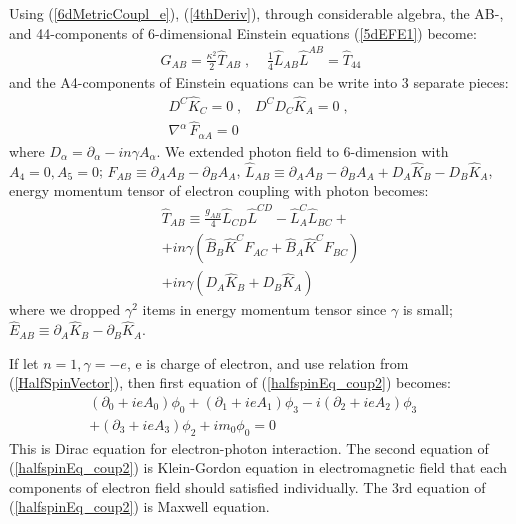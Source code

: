 \documentclass[twocolumn,showpacs,preprintnumbers,amsmath,amssymb]{revtex4}
\begin{document}
Using (\ref{6dMetricCoupl_e}), (\ref{4thDeriv}), through considerable algebra, the AB-, and 44-components of 
6-dimensional Einstein equations (\ref{5dEFE1}) become:
\begin{eqnarray}
G_{AB} = \frac{\kappa^2}{2} \hat{T}_{AB} \;, \; \; \; \;
\frac{1}{4}\hat{L}_{AB} \hat{L}^{AB} = \hat{T}_{44} 
\label{halfspinEq_coupl}
\end{eqnarray}
and the A4-components of Einstein equations can be write into 3 separate pieces:
\begin{eqnarray}
D^{C} \hat{K}_{C} = 0 \;, \; \; \; D^{C} D_{C} \hat{K}_{A} = 0 \;, \;\nonumber \\
\nabla^{\alpha} \, \hat{F}_{\alpha A} = 0 
\label{halfspinEq_coup2}
\end{eqnarray}
where $D_{\alpha} =\partial_{\alpha} - in\gamma A_{\alpha} $.
We extended photon field
to 6-dimension with $A_4 = 0, A_5 = 0$; $F_{AB} \equiv \partial_{A} A_{B} - \partial_{B} A_{A}$, 
$\hat{L}_{AB} \equiv \partial_{A} A_{B} - 
\partial_{B} A_{A} + D_{A}\hat{K}_{B} - D_{B} \hat{K}_{A}$, energy momentum tensor of electron coupling with photon becomes:
\begin{eqnarray}
\hat{T}_{AB} \equiv \frac{g_{AB}}{4}\hat{L}_{CD}\hat{L}^{CD} - \hat{L}_{A}^{C} \hat{L}_{BC} + \nonumber\\
     + in\gamma(\hat{B}_{B}\hat{K}^C F_{AC} + \hat{B}_{A}\hat{K}^C F_{BC}) \nonumber \\
     + in\gamma (D_{A}\hat{K}_{B} + D_{B}\hat{K}_{A}) 
\label{halfSpinT_e}
\end{eqnarray}
where we dropped $\gamma^2$ items in energy momentum tensor since $\gamma$ is small; $\hat{E}_{AB} \equiv \partial_{A} \hat{K}_{B} - 
\partial_{B} \hat{K}_{A}$. 

If let $n=1, \gamma = -e$, e is charge of electron, and use relation from (\ref{HalfSpinVector}), 
then first equation of (\ref{halfspinEq_coup2}) becomes:
\begin{eqnarray}
(\partial_{0} + ie A_0) \phi_0 + (\partial_{1} +ie A_1) \phi_3 - i (\partial_{2}+ie A_2) \phi_3 \; \; \; \; \nonumber \\  
 + (\partial_3 + ie A_3) \phi_2 + im_0 \phi_0 = 0
\label{ModifiedDirac_2}
\end{eqnarray}
This is Dirac equation for electron-photon interaction. 
The second equation of (\ref{halfspinEq_coup2}) is Klein-Gordon equation in electromagnetic field that
each components of electron field should satisfied individually. The 3rd equation of (\ref{halfspinEq_coup2})
is Maxwell equation.
\end{document}
